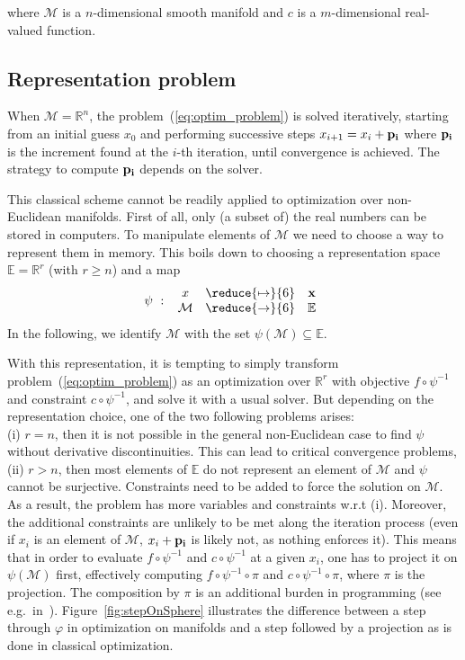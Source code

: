 where $\mathcal{M}$ is a $n$-dimensional smooth manifold and $c$ is a $m$-dimensional real-valued function.

\subsection{Representation problem}
When $\mathcal{M} = \mathbb{R}^n$, the problem~(\ref{eq:optim_problem}) is solved iteratively, starting from an initial guess $x_0$ and performing successive steps $x_{i+1} = x_i + {\bf p_i}$ where ${\bf p_i}$ is the increment found at the $i$-th iteration, until convergence is achieved.
The strategy to compute ${\bf p_i}$ depends on the solver.

This classical scheme cannot be readily applied to optimization over non-Euclidean manifolds.
First of all, only (a subset of) the real numbers can be stored in computers.
To manipulate elements of $\mathcal{M}$ we need to choose a way to represent them in memory.
This boils down to choosing a representation space $\mathbb{E} = \mathbb{R}^r$ (with $r \geq n$) and a map
\begin{equation}
  \psi\ :\
  \begin{array}{ccc}
    x & \reduce{\mapsto}{6} & \mathbf{x} \\
    \mathcal{M} & \reduce{\rightarrow}{6} & \mathbb{E}
  \end{array}\nonumber%
\end{equation}
In the following, we identify $\mathcal{M}$ with the set $\psi(\mathcal{M}) \subseteq \mathbb{E}$.

With this representation, it is tempting to simply transform problem~(\ref{eq:optim_problem}) as an optimization over $\mathbb{R}^r$ with objective $f \circ \psi^{-1}$ and constraint $c \circ \psi^{-1}$, and solve it with a usual solver.
But depending on the representation choice, one of the two following problems arises:\\
(i) $r=n$, then it is not possible in the general non-Euclidean case to find $\psi$ without derivative discontinuities.
This can lead to critical convergence problems, \\
(ii) $r>n$, then most elements of $\mathbb{E}$ do not represent an element of $\mathcal{M}$ %
and $\psi$ cannot be surjective.
Constraints need to be added to force the solution on $\mathcal{M}$.
As a result, the problem has more variables and constraints w.r.t (i).
Moreover, the additional constraints are unlikely to be met along the iteration process (even if $x_i$ is an element of $\mathcal{M}$, $x_i+{\bf p_i}$ is likely not, as nothing enforces it).
This means that in order to evaluate $f \circ \psi^{-1}$ and $c \circ \psi^{-1}$ at a given $x_i$, one has to project it on $\psi(\mathcal{M})$ first, effectively computing $f \circ \psi^{-1} \circ \pi$ and $c \circ \psi^{-1} \circ \pi$, where $\pi$ is the projection.
The composition by $\pi$ is an additional burden in programming (see e.g.\ in~\cite{bouyarmane:humanoids:2012a}).
Figure~\ref{fig:stepOnSphere} illustrates the difference between a step through $\varphi$ in optimization on manifolds and a step followed by a projection as is done in classical optimization.

